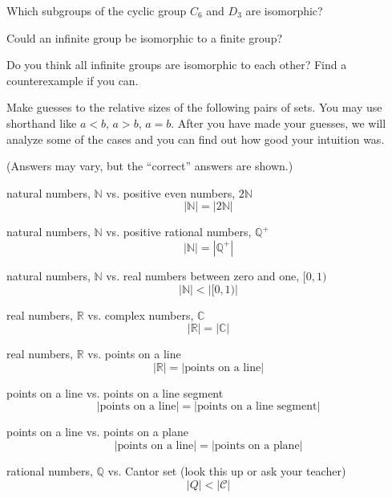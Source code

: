 \documentclass[../gatm_answers.tex]{subfiles}
\begin{document}
\begin{inner_problem}
\item Which subgroups of the cyclic group $C_6$ and $D_3$ are isomorphic?
\end{inner_problem}

\begin{outer_problem}
\item Could an infinite group be isomorphic to a finite group?
\end{outer_problem}

\begin{outer_problem}
\item Do you think all infinite groups are isomorphic to each other? Find a counterexample if you can.
\end{outer_problem}

\begin{outer_problem}
\item Make guesses to the relative sizes of the following pairs of sets. You may use shorthand like $a < b$, $a > b$, $a = b$. After you have made your guesses, we will analyze some of the cases and you can find out how good your intuition was.
\end{outer_problem}

(Answers may vary, but the ``correct'' answers are shown.)

\begin{inner_problem}[start=1]
\item natural numbers, $\mathbb{N}$ vs. positive even numbers, $2\mathbb{N}$
$$|\mathbb{N}|=|2\mathbb{N}|$$
\item natural numbers, $\mathbb{N}$ vs. positive rational numbers, $\mathbb{Q}^+$
$$|\mathbb{N}|=\left|\mathbb{Q}^+\right|$$
\item natural numbers, $\mathbb{N}$ vs. real numbers between zero and one, $[0,1)$
$$|\mathbb{N}|<|[0,1)|$$
\item real numbers, $\mathbb{R}$ vs. complex numbers, $\mathbb{C}$
$$|\mathbb{R}|=|\mathbb{C}|$$
\item real numbers, $\mathbb{R}$ vs. points on a line
$$|\mathbb{R}|=|\text{points on a line}|$$
\item points on a line vs. points on a line segment
$$|\text{points on a line}|=|\text{points on a line segment}|$$
\item points on a line vs. points on a plane
$$|\text{points on a line}|=|\text{points on a plane}|$$
\item rational numbers, $\mathbb{Q}$ vs. Cantor set (look this up or ask your teacher)
$$|Q|<|\mathcal{C}|$$
\end{inner_problem}
\end{document}
